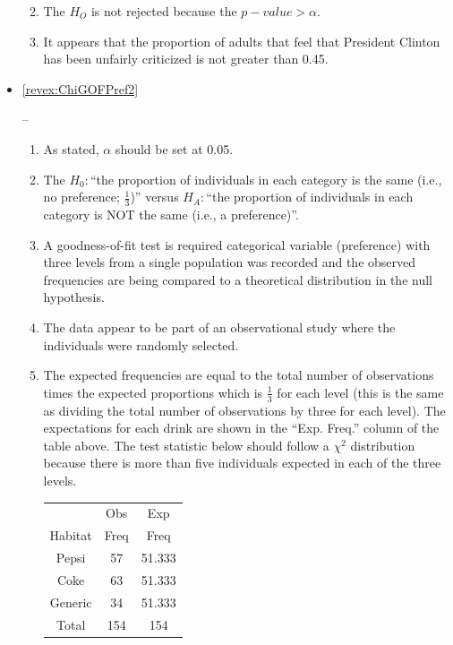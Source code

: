 \documentclass[10pt,openany]{book}\usepackage[]{graphicx}\usepackage[]{color}
\newenvironment{knitrout}{}{} %
\begin{document}
\begin{itemize}
\begin{enumerate}
\begin{knitrout}
\end{knitrout}
      \item The $H_{O}$ is not rejected because the $p-value>\alpha$.
      \item It appears that the proportion of adults that feel that President Clinton has been unfairly criticized is not greater than 0.45.
    \end{enumerate}
  \item \hypertarget{ans:ChiGOFPref2}{\ref{revex:ChiGOFPref2}} --
    \begin{enumerate}
      \item As stated, $\alpha$ should be set at 0.05.
      \item The $H_{0}:$``the proportion of individuals in each category is the same (i.e., no preference; $\frac{1}{3}$)'' versus $H_{A}:$``the proportion of individuals in each category is NOT the same (i.e., a preference)''.
      \item A goodness-of-fit test is required categorical variable (preference) with three levels from a single population was recorded and the observed frequencies are being compared to a theoretical distribution in the null hypothesis.
      \item The data appear to be part of an observational study where the individuals were randomly selected.
      \item The expected frequencies are equal to the total number of observations times the expected proportions which is $\frac{1}{3}$ for each level (this is the same as dividing the total number of observations by three for each level).  The expectations for each drink are shown in the ``Exp. Freq.'' column of the table above.  The test statistic below should follow a $\chi^{2}$ distribution because there is more than five individuals expected in each of the three levels.
        \begin{center}
          \begin{tabular}{ccc}
            \hline\hline
            & Obs & Exp \\
            Habitat & Freq & Freq \\
            \hline
            Pepsi   & 57 & 51.333 \\
            Coke    & 63 & 51.333 \\
            Generic & 34 & 51.333 \\
            \hline
            Total & 154 & 154 \\
            \hline\hline
          \end{tabular}

\end{center}
\end{enumerate}
\end{itemize}
\end{document}
